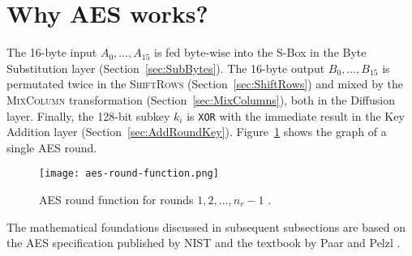\section{Why AES works?}
\label{sec:why}
\label{sec:math}

The 16-byte input $A_0, \dots, A_{15}$ is fed byte-wise into the S-Box in the Byte Substitution layer (Section~\ref{sec:SubBytes}).
The 16-byte output $B_0, \dots, B_{15}$ is permutated twice in the \textsc{ShiftRows} (Section~\ref{sec:ShiftRows}) and mixed by the \textsc{MixColumn} transformation (Section~\ref{sec:MixColumns}), both in the Diffusion layer.
Finally, the 128-bit subkey $k_i$ is \texttt{XOR} with the immediate result in the Key Addition layer (Section~\ref{sec:AddRoundKey}).
Figure~\ref{fig:aes-round-function} shows the graph of a single AES round. 

\begin{figure}[!ht]
    \centering
    \texttt{[image: aes-round-function.png]}
    \caption{
        AES round function for rounds $1, 2, \dots, n_r-1$ \cite{Paar2024}.
    }
    \label{fig:aes-round-function}
\end{figure}

The mathematical foundations discussed in subsequent subsections are based on the \gls{AES} specification published by \gls{NIST} \cite{NIST_AES} and the textbook by Paar and Pelzl \cite{Paar2024}.








\newpage

